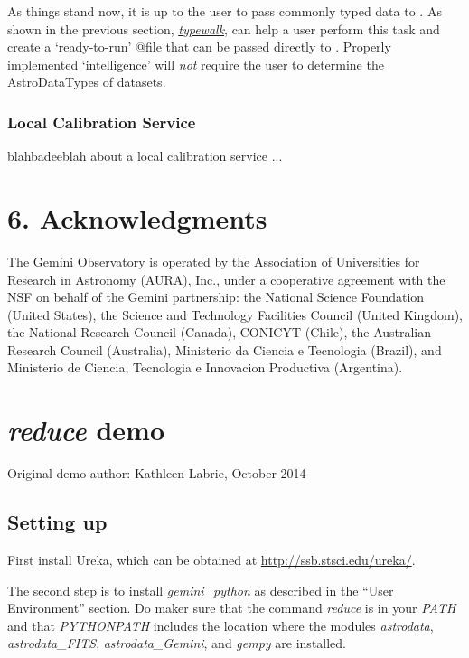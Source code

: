 \documentclass[letterpaper,10pt,english]{sphinxmanual}
\begin{document}
As things stand now, it is up to the user to pass commonly typed data to
. As shown in the previous section, {\hyperref[supptools:typewalk]{\emph{typewalk}}}, 
can help a user perform this task and create a `ready-to-run' @file that can
be passed directly to . Properly implemented `intelligence' will
\emph{not} require the user to determine the AstroDataTypes of datasets.


\subsection{Local Calibration Service}
\label{discuss:local-calibration-service}
blahbadeeblah about a local calibration service ...


\chapter{6. Acknowledgments}
\label{ack::doc}\label{ack:acknowledgments}
The Gemini Observatory is operated by the Association of Universities for
Research in Astronomy (AURA), Inc., under a cooperative agreement with the NSF on
behalf of the Gemini partnership: the National Science Foundation
(United States), the Science and Technology Facilities Council (United Kingdom),
the National Research Council (Canada), CONICYT (Chile), the Australian
Research Council (Australia), Ministerio da Ciencia e Tecnologia (Brazil),
and Ministerio de Ciencia, Tecnologia e Innovacion Productiva (Argentina).
\appendix
\noappendicestocpagenum
\addappheadtotoc

\chapter{\emph{reduce} demo}
\label{appendices/appendix_demo::doc}\label{appendices/appendix_demo:reduce-demo}
Original demo author: Kathleen Labrie, October 2014


\section{Setting up}
\label{appendices/appendix_demo:setting-up}
First install Ureka, which can be obtained at \href{http://ssb.stsci.edu/ureka/}{http://ssb.stsci.edu/ureka/}.

The second step is to install \emph{gemini\_python} as described in the ``User Environment''
section.  Do maker sure that the command \emph{reduce} is in your \emph{PATH} and that
\emph{PYTHONPATH} includes the location where the modules \emph{astrodata}, \emph{astrodata\_FITS},
\emph{astrodata\_Gemini}, and \emph{gempy} are installed.
\end{document}
